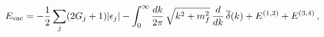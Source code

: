 \begin{equation}
E_{\rm vac} =  -\frac{1}{2}\sum_j(2G_j+1)|\epsilon_j| - 
\int_0^\infty \frac{dk}{2\pi}\,\sqrt{k^2+m_f^2}\,
\frac{d}{dk}\,\overline{\delta}(k) + E^{(1,2)} + E^{(3,4)} \, , 
\label{Evac}
\end{equation}

